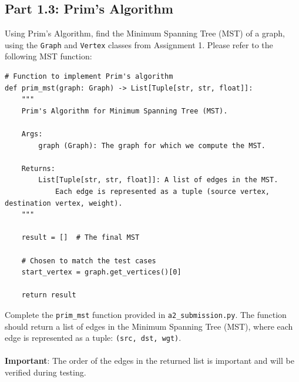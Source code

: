 \documentclass[12pt]{report}
\begin{document}
\subsection*{Part 1.3: Prim's Algorithm}
Using Prim's Algorithm, find the Minimum Spanning Tree (MST) of a graph, using the \texttt{Graph} and \texttt{Vertex} classes from Assignment 1. Please refer to the following MST function:
\begin{lstlisting}
# Function to implement Prim's algorithm
def prim_mst(graph: Graph) -> List[Tuple[str, str, float]]:
    """
    Prim's Algorithm for Minimum Spanning Tree (MST).

    Args:
        graph (Graph): The graph for which we compute the MST.

    Returns:
        List[Tuple[str, str, float]]: A list of edges in the MST. 
            Each edge is represented as a tuple (source vertex, destination vertex, weight).
    """
    
    result = []  # The final MST

    # Chosen to match the test cases
    start_vertex = graph.get_vertices()[0]
    
    return result  
\end{lstlisting}
Complete the \texttt{prim\_mst} function provided in \texttt{a2\_submission.py}. 
The function should return a list of edges in the Minimum Spanning Tree (MST), where each edge is represented as a tuple: \texttt{(src, dst, wgt)}.
\\~\\
\textbf{Important}: The order of the edges in the returned list is important and will be verified during testing.

\clearpage
\end{document}
